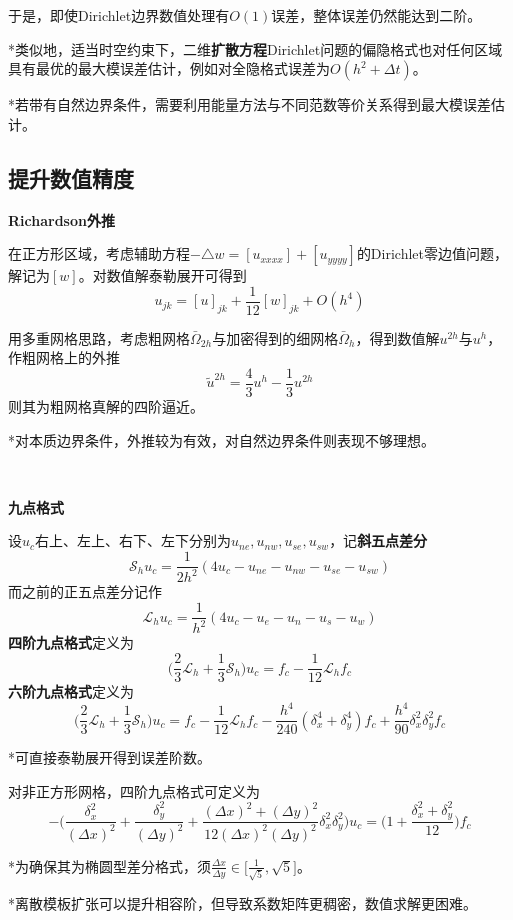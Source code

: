 \documentclass[a4paper,UTF8,fontset=windows]{ctexart}
\begin{document}
于是，即使Dirichlet边界数值处理有$O(1)$误差，整体误差仍然能达到二阶。

*类似地，适当时空约束下，二维\textbf{扩散方程}Dirichlet问题的偏隐格式也对任何区域具有最优的最大模误差估计，例如对全隐格式误差为$O(h^2+\Delta t)$。

*若带有自然边界条件，需要利用能量方法与不同范数等价关系得到最大模误差估计。

\subsection{提升数值精度}

\textbf{Richardson外推}

在正方形区域，考虑辅助方程$-\triangle w=[u_{xxxx}]+[u_{yyyy}]$的Dirichlet零边值问题，解记为$[w]$。对数值解泰勒展开可得到
$$u_{jk}=[u]_{jk}+\frac{1}{12}[w]_{jk}+O(h^4)$$

用多重网格思路，考虑粗网格$\bar{\Omega}_{2h}$与加密得到的细网格$\bar{\Omega}_h$，得到数值解$u^{2h}$与$u^h$，作粗网格上的外推
$$\tilde{u}^{2h}=\frac{4}{3}u^h-\frac{1}{3}u^{2h}$$
则其为粗网格真解的四阶逼近。

*对本质边界条件，外推较为有效，对自然边界条件则表现不够理想。

\

\textbf{九点格式}

设$u_c$右上、左上、右下、左下分别为$u_{ne},u_{nw},u_{se},u_{sw}$，记\textbf{斜五点差分}
$$\mathcal{S}_hu_c=\frac{1}{2h^2}(4u_c-u_{ne}-u_{nw}-u_{se}-u_{sw})$$
而之前的正五点差分记作
$$\mathcal{L}_hu_c=\frac{1}{h^2}(4u_c-u_e-u_n-u_s-u_w)$$
\textbf{四阶九点格式}定义为
$$\bigg(\frac{2}{3}\mathcal{L}_h+\frac{1}{3}\mathcal{S}_h\bigg)u_c=f_c-\frac{1}{12}\mathcal{L}_hf_c$$
\textbf{六阶九点格式}定义为
$$\bigg(\frac{2}{3}\mathcal{L}_h+\frac{1}{3}\mathcal{S}_h\bigg)u_c=f_c-\frac{1}{12}\mathcal{L}_hf_c-\frac{h^4}{240}(\delta_x^4+\delta_y^4)f_c+\frac{h^4}{90}\delta_x^2\delta_y^2f_c$$

*可直接泰勒展开得到误差阶数。

对非正方形网格，四阶九点格式可定义为
$$-\bigg(\frac{\delta_x^2}{(\Delta x)^2}+\frac{\delta_y^2}{(\Delta y)^2}+\frac{(\Delta x)^2+(\Delta y)^2}{12(\Delta x)^2(\Delta y)^2}\delta_x^2\delta_y^2\bigg)u_c=\bigg(1+\frac{\delta_x^2+\delta_y^2}{12}\bigg)f_c$$

*为确保其为椭圆型差分格式，须$\frac{\Delta x}{\Delta y}\in\big[\frac{1}{\sqrt5},\sqrt5\big]$。

*离散模板扩张可以提升相容阶，但导致系数矩阵更稠密，数值求解更困难。

\
\end{document}
